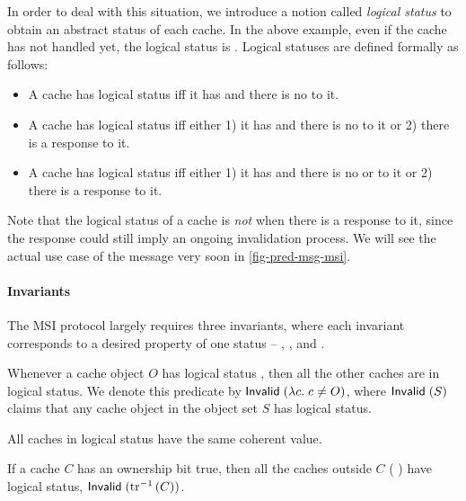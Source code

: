 In order to deal with this situation, we introduce a notion called \emph{logical status} to obtain an abstract status of each cache.
In the above example, even if the cache has not handled  yet, the logical status is \stI{}.
Logical statuses are defined formally as follows:
\begin{itemize}
\item A cache has logical status \stM{} iff it has \stM{} and there is no  to it.
\item A cache has logical status \stS{} iff either 1) it has \stS{} and there is no  to it or 2) there is a response  to it.
\item A cache has logical status \stI{} iff either 1) it has \stI{} and there is no  or  to it or 2) there is a response  to it.
\end{itemize}
Note that the logical status of a cache is \emph{not} \stM{} when there is a response  to it, since the response could still imply an ongoing invalidation process.
We will see the actual use case of the  message very soon in \autoref{fig-pred-msg-msi}.

\paragraph{Invariants}
The MSI protocol largely requires three invariants, where each invariant corresponds to a desired property of one status -- \stM{}, \stS{}, and \stI{}.

\begin{invariant}
  \label{inv-excl}
  Whenever a cache object $O$ has logical status \stM{}, then all the other caches are in logical \stI{} status.
  We denote this predicate by $\textsf{Invalid}\;(\lambda c.\; c \neq O)$, where $\textsf{Invalid}\;(S)$ claims that any cache object in the object set $S$ has logical \stI{} status.
\end{invariant}

\begin{invariant}
  \label{inv-sharing}
  All caches in logical \stS{} status have the same coherent value.
\end{invariant}

\begin{invariant}
  \label{inv-inv-ownership}
  If a cache $C$ has an ownership bit true, then all the caches outside $C$ (\ie{} ) have logical \stI{} status, \ie{} $\textsf{Invalid}\;(\textrm{tr}^{-1}\,(C))$.
\end{invariant}


